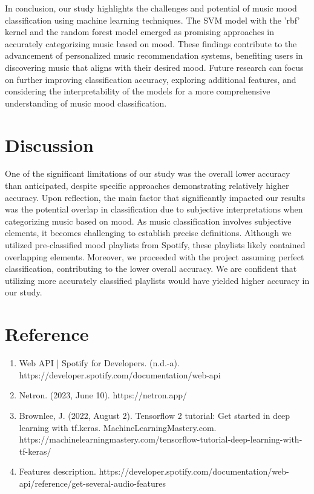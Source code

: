 \documentclass{article}
\begin{document}
In conclusion, our study highlights the challenges and potential of music mood classification using machine learning techniques. The SVM model with the 'rbf' kernel and the random forest model emerged as promising approaches in accurately categorizing music based on mood. These findings contribute to the advancement of personalized music recommendation systems, benefiting users in discovering music that aligns with their desired mood. Future research can focus on further improving classification accuracy, exploring additional features, and considering the interpretability of the models for a more comprehensive understanding of music mood classification.

\section{Discussion}
One of the significant limitations of our study was the overall lower accuracy than anticipated, despite specific approaches demonstrating relatively higher accuracy. Upon reflection, the main factor that significantly impacted our results was the potential overlap in classification due to subjective interpretations when categorizing music based on mood. As music classification involves subjective elements, it becomes challenging to establish precise definitions. Although we utilized pre-classified mood playlists from Spotify, these playlists likely contained overlapping elements. Moreover, we proceeded with the project assuming perfect classification, contributing to the lower overall accuracy. We are confident that utilizing more accurately classified playlists would have yielded higher accuracy in our study.

\section*{Reference}
\begin{enumerate}
\item Web API | Spotify for Developers. (n.d.-a). https://developer.spotify.com/documentation/web-api 
\item Netron. (2023, June 10). https://netron.app/ 
\item Brownlee, J. (2022, August 2). Tensorflow 2 tutorial: Get started in deep learning with tf.keras. MachineLearningMastery.com. https://machinelearningmastery.com/tensorflow-tutorial-deep-learning-with-tf-keras/ 
\item Features description. https://developer.spotify.com/documentation/web-api/reference/get-several-audio-features
\end{enumerate}
\end{document}

